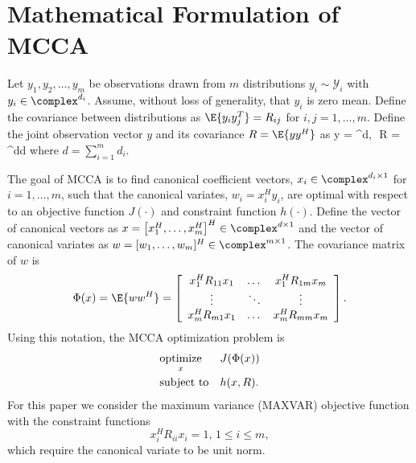 \section{Mathematical Formulation of MCCA}

Let $y_1,y_2,\dots,y_m$ be observations drawn from $m$ distributions $y_i\sim
\mathcal{Y}_i$ with $y_i\in\complex^{d_i}$. Assume, without loss of generality, that $y_i$
is zero mean. Define the covariance between distributions as $\E{y_iy_j^T}=R_{ij}$ for
$i,j=1,\dots,m$. Define the joint observation vector $y$ and its covariance $R=\E{yy^H}$ as
\be
y =  \in\complex^{d},\,\,\,\,R
= \in\complex^{d\times d}
\ee
where $d=\sum_{i=1}^md_i$.

The goal of MCCA is to find canonical coefficient vectors, $x_i\in\complex^{d_i\times 1}$
for $i=1,\dots,m$, such that the canonical variates, $w_i=x_i^Hy_i$, are optimal with
respect to an objective function $J(\cdot)$ and constraint function $h(\cdot)$. Define the
vector of canonical vectors as 
$x=\left[x_1^H,\dots,x_m^H\right]^H\in\complex^{d\times 1}$ and the vector of canonical
variates as $w=[w_1,\dots,w_m]^H\in\complex^{m\times 1}$. The covariance matrix of $w$ is
\begin{equation*}
\Phi(x)=\E{ww^H}=\left[\begin{array}{ccc} x_1^HR_{11}x_1 & \dots & x_1^HR_{1m}x_m \\ \vdots
    & \ddots & \vdots \\ x_m^HR_{m1}x_1 & \dots & x_m^HR_{mm}x_m\\ \end{array}\right].
\end{equation*}
Using this notation, the MCCA optimization problem is
\begin{equation}\label{eq:chpt10:opt_prob}
\begin{aligned}
&\underset{x}{\mathop{\rm optimize}} && J(\Phi(x))\\
&\text{subject to} && h(x,R).\\
\end{aligned}
\end{equation}
For this paper we consider the maximum variance (MAXVAR) objective function with the
constraint functions
  \begin{equation*}
    x_i^HR_{ii}x_i = 1,\, 1\leq i\leq m,
  \end{equation*}
which require the canonical variate to be unit norm.

